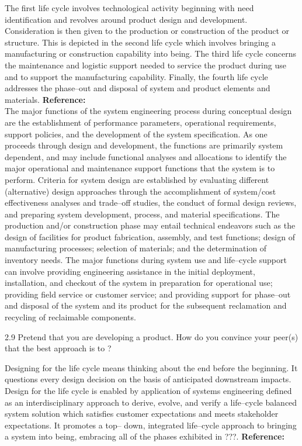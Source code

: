 \begin{exsol@solution}{}
        The first life cycle involves technological activity beginning with need identification and revolves around product design and development. Consideration is then given to the production or construction of the product or structure. This is depicted in the second life cycle which involves bringing a manufacturing or construction capability into being. The third life cycle concerns the maintenance and logistic support needed to service the product during use and to support the manufacturing capability. Finally, the fourth life cycle addresses the phase–out and disposal of system and product elements and materials. \textbf{Reference:}\\
        The major functions of the system engineering process during conceptual design are the establishment of performance parameters, operational requirements, support policies, and the development of the system specification. As one proceeds through design and development, the functions are primarily system dependent, and may include functional analyses and allocations to identify the major operational and maintenance support functions that the system is to perform. Criteria for system design are established by evaluating different (alternative) design approaches through the accomplishment of system/cost effectiveness analyses and trade–off studies, the conduct of formal design reviews, and preparing system development, process, and material specifications. The production and/or construction phase may entail technical endeavors such as the design of facilities for product fabrication, assembly, and test functions; design of manufacturing processes; selection of materials; and the determination of inventory needs. The major functions during system use and life–cycle support can involve providing engineering assistance in the initial deployment, installation, and checkout of the system in preparation for operational use; providing field service or customer service; and providing support for phase–out and disposal of the system and its product for the subsequent reclamation and recycling of reclaimable components.
\end{exsol@solution}
\begin{exsol@exercise}{2.9}
    \label{sea-2-12}
        Pretend that you are developing a product. How do you convince your peer(s) that the best approach is to ?
\end{exsol@exercise}
\begin{exsol@solution}{}
        Designing for the life cycle means thinking about the end before the beginning. It questions every design decision on the basis of anticipated downstream impacts. Design for the life cycle is enabled by application of systems engineering defined as an interdisciplinary approach to derive, evolve, and verify a life–cycle balanced system solution which satisfies customer expectations and meets stakeholder expectations. It promotes a top– down, integrated life–cycle approach to bringing a system into being, embracing all of the phases exhibited in ???. \textbf{Reference:}
\end{exsol@solution}
